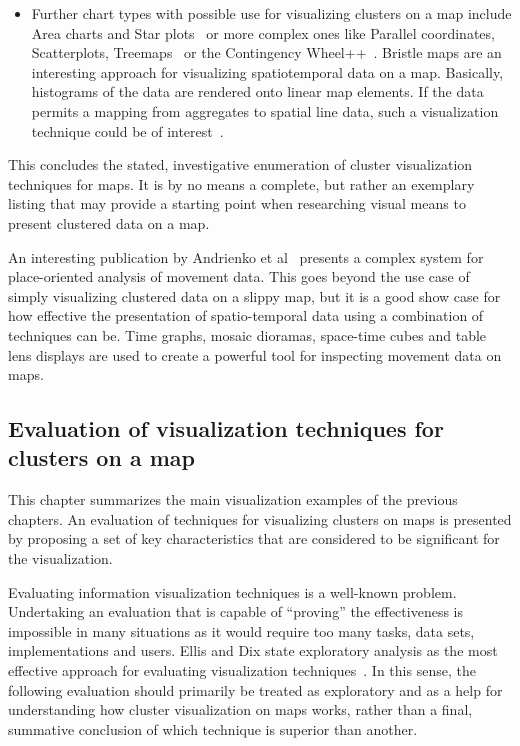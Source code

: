 \begin{itemize}
\begin{itemize}
\item Further chart types with possible use for visualizing clusters on a map include Area charts and Star plots~\cite{ladenhauf12dia} or more complex ones like Parallel coordinates, Scatterplots, Treemaps~\cite{zhang07thesis} or the Contingency Wheel++~\cite{VAST2012}. Bristle maps are an interesting approach for visualizing spatiotemporal data on a map. Basically, histograms of the data are rendered onto linear map elements. If the data permits a mapping from aggregates to spatial line data, such a visualization technique could be of interest~\cite{bristle}.

\end{itemize}

\end{itemize}

This concludes the stated, investigative enumeration of cluster visualization techniques for maps. It is by no means a complete, but rather an exemplary listing that may provide a starting point when researching visual means to present clustered data on a map.

An interesting publication by Andrienko et al~\cite{andrienko2012sca} presents a complex system for place-oriented analysis of movement data. This goes beyond the use case of simply visualizing clustered data on a slippy map, but it is a good show case for how effective the presentation of spatio-temporal data using a combination of techniques can be. Time graphs, mosaic dioramas, space-time cubes and table lens displays are used to create a powerful tool for inspecting movement data on maps.

\subsection{Evaluation of visualization techniques for clusters on a map}

This chapter summarizes the main visualization examples of the previous chapters. An evaluation of techniques for visualizing clusters on maps is presented by proposing a set of key characteristics that are considered to be significant for the visualization.

Evaluating information visualization techniques is a well-known problem. Undertaking an evaluation that is capable of ``proving'' the effectiveness is impossible in many situations as it would require too many tasks, data sets, implementations and users. Ellis and Dix state exploratory analysis as the most effective approach for evaluating visualization techniques~\cite{ellis06eval, Delort10vis}. In this sense, the following evaluation should primarily be treated as exploratory and as a help for understanding how cluster visualization on maps works, rather than a final, summative conclusion of which technique is superior than another. 

